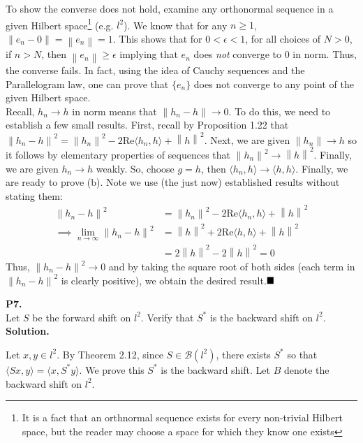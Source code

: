 \documentclass{article}
\newcommand{\norm}[1]{\left\lVert#1\right\rVert}
\begin{document}
    To show the converse does not hold, examine any orthonormal sequence in a given Hilbert space\footnote{It is a fact that an 
    orthnormal sequence exists for every non-trivial Hilbert space, but the reader may choose a space for which they know one exists}
    (e.g. $l^2$). We know that
    for any $n\geq 1$, $\norm{e_n - 0} = \norm{e_n} = 1$. This shows that for $0 < \epsilon < 1$, for all choices of $N>0$,
    if $n>N$, then $\norm{e_n}\geq \epsilon$ implying that $e_n$ does \textit{not} converge to $0$ in norm. Thus, the converse fails.
    In fact, using the idea of Cauchy sequences and the Parallelogram law, one can prove that $\{e_n\}$ does not converge to any
    point of the given Hilbert space.\\

    Recall, $h_n\to h$ in norm means that $\norm{h_n-h}\to 0$. To do this, we need to establish a few small results. First, recall
    by Proposition 1.22 that $\norm{h_n-h}^2 = \norm{h_n}^2 - 2\text{Re}\langle h_n,h\rangle + \norm{h}^2$. Next,
    we are given $\norm{h_n} \to h$ so it follows by elementary properties of sequences that $\norm{h_n}^2 \to \norm{h}^2$.
    Finally, we are given $h_n\to h$ weakly. So, choose $g = h$, then $\langle h_n,h\rangle \to \langle h,h\rangle$. Finally,
    we are ready to prove (b). Note we use (the just now) established results without stating them:
    \begin{align*}
        \norm{h_n-h}^2 &= \norm{h_n}^2 - 2\text{Re}\langle h_n,h\rangle + \norm{h}^2 \\
            \implies \lim_{n\to\infty} \norm{h_n-h}^2 &= \norm{h}^2 + 2\text{Re}\langle h,h\rangle + \norm{h}^2 \\
            &= 2\norm{h}^2 - 2\norm{h}^2 = 0
    \end{align*}
    Thus, $\norm{h_n-h}^2\to 0$ and by taking the square root of both sides (each term in $\norm{h_n-h}^2$ is clearly positive),
    we obtain the desired result.$\hfill\blacksquare$

    \newpage

    \textbf{P7.}\\

    Let $S$ be the forward shift on $l^2$. Verify that $S^*$ is the backward shift on $l^2$.\\

    \textbf{Solution.}

    Let $x,y\in l^2$. By Theorem 2.12, since $S\in\mathcal{B}(l^2)$, there exists $S^*$ so that $\langle Sx,y\rangle =
    \langle x,S^* y\rangle$. We prove this $S^*$ is the backward shift. Let $B$ denote the backward shift on $l^2$.\\
\end{document}
